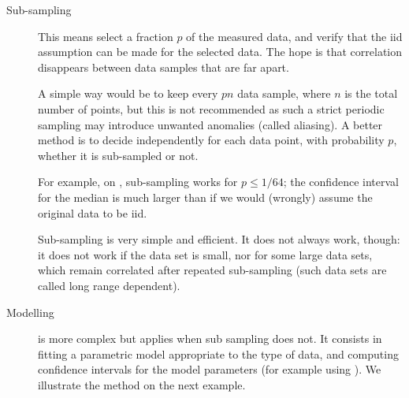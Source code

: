 \begin{description}
    \item[Sub-sampling] This means select a
fraction $p$ of the measured data, and verify
that the iid assumption can be made for the
selected data. The hope is that correlation
disappears between data samples that are far
apart.

A simple way would be to keep every $pn$ data
sample, where $n$ is the total number of points,
but this is not recommended as such a strict
periodic sampling may introduce unwanted
anomalies (called aliasing). A better method is
to decide independently for each data point, with
probability $p$, whether it is sub-sampled or
not.

For example, on , sub-sampling
works for $p\leq 1/64$; the confidence interval
for the median is much larger than if we would
(wrongly) assume the original data to be iid.

Sub-sampling is very simple and efficient. It does not
always work, though: it does not work if the data set is
small, nor for some large data sets, which remain
correlated after repeated sub-sampling (such data sets are
called long range dependent).

    \item[Modelling] is more complex but applies
    when sub sampling does not. It consists in
    fitting a parametric model appropriate to the type of data, and
    computing confidence intervals for the model
parameters (for example using
). We illustrate the method on
the next example.
\end{description}

\begin{figure}[!htbp]
\begin{center}
%
%
  \end{center}
\end{figure}


